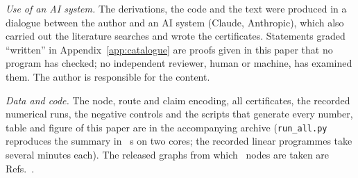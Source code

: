 \documentclass[aps,pra,10pt,twocolumn,superscriptaddress,nofootinbib,floatfix]{revtex4-2}
\theoremstyle{definition}
\theoremstyle{remark}
\begin{document}
\maketitle









\begin{acknowledgments}
\emph{Use of an AI system.} The derivations, the code and the text were produced in a dialogue between the author and an AI system (Claude, Anthropic), which also carried out the literature searches and wrote the certificates. Statements graded ``written'' in Appendix~\ref{app:catalogue} are proofs given in this paper that no program has checked; no independent reviewer, human or machine, has examined them. The author is responsible for the content.

\emph{Data and code.} The node, route and claim encoding, all certificates, the recorded numerical runs, the negative controls and the scripts that generate every number, table and figure of this paper are in the accompanying archive (\texttt{run\_all.py} reproduces the summary in \runSeconds~s on two cores; the recorded linear programmes take several minutes each). The released graphs from which \nReleased\ nodes are taken are Refs.~\cite{genhep,gengpt,genqrt}.
\end{acknowledgments}

\appendix





\end{document}
